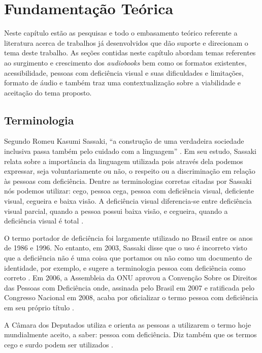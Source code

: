 \chapter[Fundamentação Teórica]{Fundamentação Teórica}\label{cap2}

Neste capítulo estão as pesquisas e todo o embasamento teórico referente a literatura acerca de trabalhos já desenvolvidos que dão suporte e direcionam o tema deste trabalho. As seções contidas neste capítulo abordam temas referentes ao surgimento e crescimento dos \textit{audiobooks} bem como os formatos existentes, acessibilidade, pessoas com deficiência visual e suas dificuldades e limitações, formato de áudio e também traz uma contextualização sobre a viabilidade e aceitação do tema proposto.

\section{Terminologia}

Segundo Romeu Kasumi Sassaki, ``a construção de uma verdadeira sociedade inclusiva passa também pelo cuidado com a linguagem'' \cite{sassaki}. Em seu estudo, Sassaki relata sobre a importância da linguagem utilizada pois através dela podemos expressar, seja voluntariamente ou não, o respeito ou a discriminação em relação às pessoas com deficiência. Dentre as terminologias corretas citadas por Sassaki nós podemos utilizar: cego, pessoa cega, pessoa com deficiência visual, deficiente visual, cegueira e baixa visão. A deficiência visual diferencia-se entre deficiência visual parcial, quando a pessoa possui baixa visão, e cegueira, quando a deficiência visual é total \cite{sassaki}.

O termo portador de deficiência foi largamente utilizado no Brasil entre os anos de 1986 e 1996. No entanto, em 2003, Sassaki disse que o uso é incorreto visto que a deficiência não é uma coisa que portamos ou não como um documento de identidade, por exemplo, e sugere a terminologia pessoa com deficiência como correto \cite{sassaki}. Em 2006, a Assembleia da ONU aprovou a Convenção Sobre os Direitos das Pessoas com Deficiência onde, assinada pelo Brasil em 2007 e ratificada pelo Congresso Nacional em 2008, acaba por oficializar o termo pessoa com deficiência em seu próprio título \cite{bengalalegal}.

A Câmara dos Deputados utiliza e orienta as pessoas a utilizarem o termo hoje mundialmente aceito, a saber: pessoa com deficiência. Diz também que os termos cego e surdo podem ser utilizados \cite{camara}.

